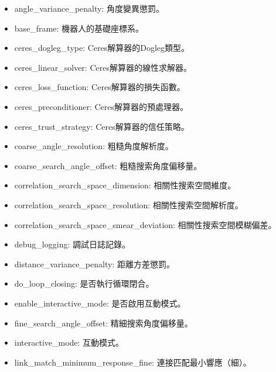 \begin{itemize}
    \item angle\_variance\_penalty: 角度變異懲罰。

    \item base\_frame: 機器人的基礎座標系。

    \item ceres\_dogleg\_type: Ceres解算器的Dogleg類型。

    \item ceres\_linear\_solver: Ceres解算器的線性求解器。

    \item ceres\_loss\_function: Ceres解算器的損失函數。

    \item ceres\_preconditioner: Ceres解算器的預處理器。

    \item ceres\_trust\_strategy: Ceres解算器的信任策略。

    \item coarse\_angle\_resolution: 粗糙角度解析度。

    \item coarse\_search\_angle\_offset: 粗糙搜索角度偏移量。

    \item correlation\_search\_space\_dimension: 相關性搜索空間維度。

    \item correlation\_search\_space\_resolution: 相關性搜索空間解析度。

    \item correlation\_search\_space\_smear\_deviation: 相關性搜索空間模糊偏差。

    \item debug\_logging: 調試日誌記錄。

    \item distance\_variance\_penalty: 距離方差懲罰。

    \item do\_loop\_closing: 是否執行循環閉合。

    \item enable\_interactive\_mode: 是否啟用互動模式。

    \item fine\_search\_angle\_offset: 精細搜索角度偏移量。

    \item interactive\_mode: 互動模式。

    \item link\_match\_minimum\_response\_fine: 連接匹配最小響應（細）。


\end{itemize}

